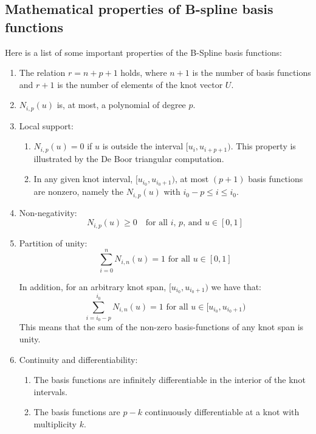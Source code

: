 \subsection{Mathematical properties of B-spline basis functions}
Here is a list of some important properties of the B-Spline basis functions:

\begin{enumerate}

    \item The relation $r = n + p + 1$ holds, where $n+1$ is the number of basis functions and $r+1$ is the number of elements of the knot vector $U$.
    
    \item $N_{i,p}(u)$ is, at most, a polynomial of degree $p$.

    \item Local support:
    \begin{enumerate}
        \item $N_{i,p}(u)=0$ if $u$ is outside the interval $[u_{i}, u_{i+p+1})$. This property is illustrated by the De Boor triangular computation.
        \item In any given knot interval, $[u_{i_{0}}, u_{i_{0}+1})$, at most $(p+1)$ basis functions are nonzero, namely the $N_{i,p}(u)$ with $i_{0}-p \leq i \leq i_{0}$.
    \end{enumerate}

    \item Non-negativity:
        \begin{equation*}
            N_{i,p}(u) \geq 0 \quad \text{for all $i$, $p$, and $u \in [0, 1]$}
        \end{equation*}
        
    \item Partition of unity:
        \begin{equation*}
            \sum_{i=0}^n N_{i,n}(u) = 1 \text{ for all } u \in [0, 1]
        \end{equation*}
    
    In addition, for an arbitrary knot span, $[u_{i_{0}}, u_{i_{0}+1})$ we have that:
        \begin{equation*}
            \sum_{i=i_{0}-p}^{i_{0}} N_{i,n}(u) = 1 \text{ for all } u \in [u_{i_{0}}, u_{i_{0}+1})
        \end{equation*}
    This means that the sum of the non-zero basis-functions of any knot span is unity.
        
    \item Continuity and differentiability:
        \begin{enumerate}
            \item The basis functions are infinitely differentiable in the interior of the knot intervals.
            \item The basis functions are $p-k$ continuously differentiable at a knot with multiplicity $k$.
        \end{enumerate}
        

\end{enumerate}
